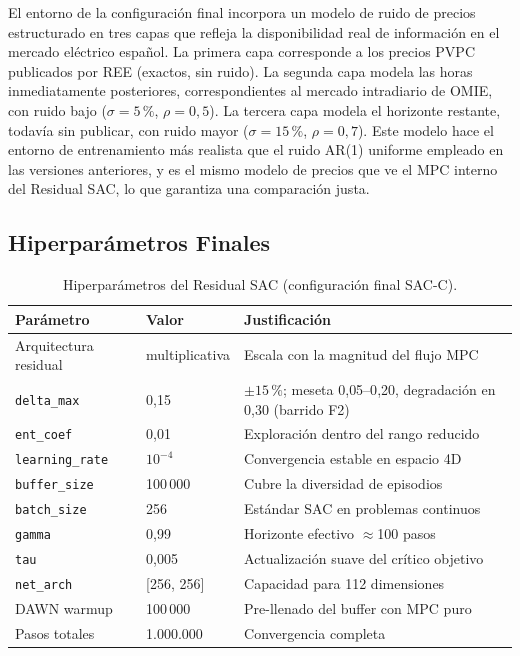 \documentclass[12pt, a4paper, twoside]{report}
\begin{document}
El entorno de la configuración final incorpora un modelo de ruido de precios
estructurado en tres capas que refleja la disponibilidad real de información en
el mercado eléctrico español. La primera capa corresponde a los precios PVPC
publicados por REE (exactos, sin ruido). La segunda capa modela las horas
inmediatamente posteriores, correspondientes al mercado intradiario de OMIE,
con ruido bajo ($\sigma=5\,\%$, $\rho=0{,}5$). La tercera capa modela el
horizonte restante, todavía sin publicar, con ruido mayor ($\sigma=15\,\%$,
$\rho=0{,}7$). Este modelo hace el entorno de entrenamiento más realista que el
ruido AR(1) uniforme empleado en las versiones anteriores, y es el mismo modelo
de precios que ve el MPC interno del Residual SAC, lo que garantiza una
comparación justa.

\subsection{Hiperparámetros Finales}
\label{sub:hiperparams}

\begin{table}[H]
\centering
\caption{Hiperparámetros del Residual SAC (configuración final SAC-C).}
\label{tab:hyperparams}
\begin{tabularx}{\textwidth}{llX}
\toprule
\textbf{Parámetro} & \textbf{Valor} & \textbf{Justificación} \\
\midrule
Arquitectura residual & multiplicativa & Escala con la magnitud del flujo MPC \\
\texttt{delta\_max} & 0{,}15 & $\pm15\,\%$; meseta 0{,}05--0{,}20, degradación en 0{,}30 (barrido F2) \\
\texttt{ent\_coef} & 0{,}01 & Exploración dentro del rango reducido \\
\texttt{learning\_rate} & $10^{-4}$ & Convergencia estable en espacio 4D \\
\texttt{buffer\_size} & 100\,000 & Cubre la diversidad de episodios \\
\texttt{batch\_size} & 256 & Estándar SAC en problemas continuos \\
\texttt{gamma} & 0{,}99 & Horizonte efectivo $\approx$100 pasos \\
\texttt{tau} & 0{,}005 & Actualización suave del crítico objetivo \\
\texttt{net\_arch} & [256, 256] & Capacidad para 112 dimensiones \\
DAWN warmup & 100\,000 & Pre-llenado del buffer con MPC puro \\
Pasos totales & 1.000.000 & Convergencia completa \\
\bottomrule
\end{tabularx}
\end{table}
\end{document}

